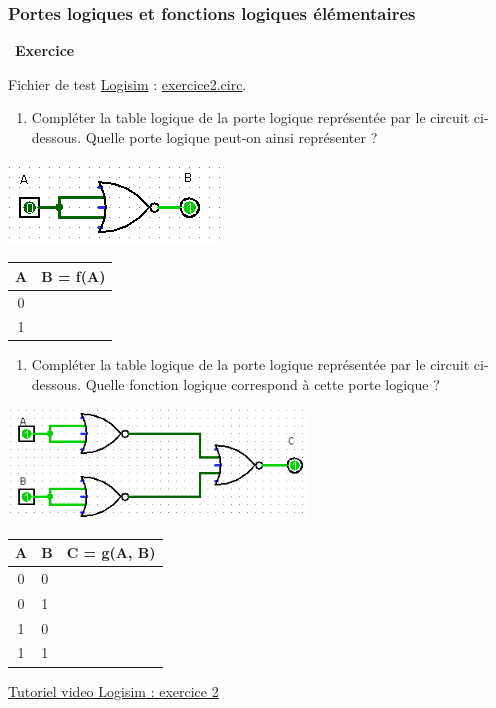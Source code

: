 \documentclass[
  11pt,
]{article}
\providecommand{\tightlist}{%
  \setlength{\itemsep}{0pt}\setlength{\parskip}{0pt}}
\newcounter{exo}
\newenvironment{exercice}[1]
{\par \medskip   \addtocounter{exo}{1} \noindent  
\begin{bclogo}[arrondi =0.1,   noborder = true, logo=\bccrayon, marge=4]{~\textbf{Exercice} \textbf{\theexo} {\itshape #1} }  \par}
{
\end{bclogo}
 \par \bigskip }
\newcounter{def}
\newcounter{logi}
\begin{document}
\hypertarget{portes-logiques-et-fonctions-logiques-uxe9luxe9mentaires}{%
\subsubsection{Portes logiques et fonctions logiques
élémentaires}\label{portes-logiques-et-fonctions-logiques-uxe9luxe9mentaires}}

\begin{exercice}{}

Fichier de test \href{http://www.cburch.com/logisim/}{Logisim} :
\href{circuits_logisim/exercice2.circ}{exercice2.circ}.

\begin{enumerate}
\def\labelenumi{\arabic{enumi}.}
\tightlist
\item
  Compléter la table logique de la porte logique représentée par le
  circuit ci-dessous. Quelle porte logique peut-on ainsi représenter ?
\end{enumerate}

\includegraphics{images/porte_not_with_nor.png}\\

\begin{longtable}[]{@{}cl@{}}
\toprule
A & B = f(A)\tabularnewline
\midrule
\endhead
0 &\tabularnewline
1 &\tabularnewline
\bottomrule
\end{longtable}

\begin{enumerate}
\def\labelenumi{\arabic{enumi}.}
\setcounter{enumi}{1}
\tightlist
\item
  Compléter la table logique de la porte logique représentée par le
  circuit ci-dessous. Quelle fonction logique correspond à cette porte
  logique ?
\end{enumerate}

\includegraphics[width=0.6\textwidth,height=\textheight]{images/porte_and_with_nor.png}\\

\begin{longtable}[]{@{}cll@{}}
\toprule
A & B & C = g(A, B)\tabularnewline
\midrule
\endhead
0 & 0 &\tabularnewline
0 & 1 &\tabularnewline
1 & 0 &\tabularnewline
1 & 1 &\tabularnewline
\bottomrule
\end{longtable}

\href{videos/exercice2.mp4}{Tutoriel video Logisim : exercice 2}

\end{exercice}
\end{document}
